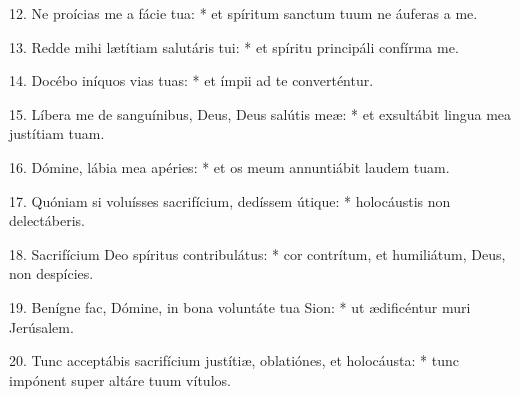 12. Ne proícias me a fácie tua: * et spíritum sanctum tuum ne áuferas a me.

13. Redde mihi lætítiam salutáris tui: * et spíritu principáli confírma me.

14. Docébo iníquos vias tuas: * et ímpii ad te converténtur.

15. Líbera me de sanguínibus, Deus, Deus salútis meæ: * et exsultábit lingua mea justítiam tuam.

16. Dómine, lábia mea apéries: * et os meum annuntiábit laudem tuam.

17. Quóniam si voluísses sacrifícium, dedíssem útique: * holocáustis non delectáberis.

18. Sacrifícium Deo spíritus contribulátus: * cor contrítum, et humiliátum, Deus, non despícies.

19. Benígne fac, Dómine, in bona voluntáte tua Sion: * ut ædificéntur muri Jerúsalem.

20. Tunc acceptábis sacrifícium justítiæ, oblatiónes, et holocáusta: * tunc impónent super altáre tuum vítulos.

\respice
